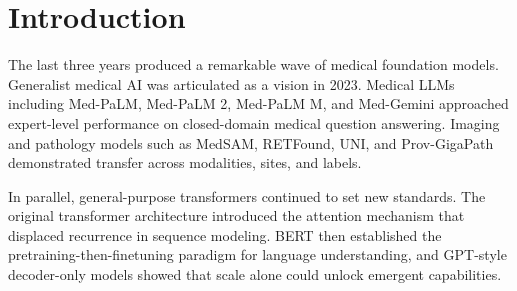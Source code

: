 \section{Introduction}

The last three years produced a remarkable wave of medical foundation models.
Generalist medical AI was articulated as a vision in 2023. Medical LLMs
including Med-PaLM, Med-PaLM 2, Med-PaLM M, and Med-Gemini approached
expert-level performance on closed-domain medical question answering.
Imaging and pathology models such as MedSAM, RETFound, UNI, and
Prov-GigaPath demonstrated transfer across modalities, sites, and labels.

In parallel, general-purpose transformers continued to set new standards.
The original transformer architecture introduced the attention mechanism
that displaced recurrence in sequence modeling. BERT then established the
pretraining-then-finetuning paradigm for language understanding, and
GPT-style decoder-only models showed that scale alone could unlock
emergent capabilities.
